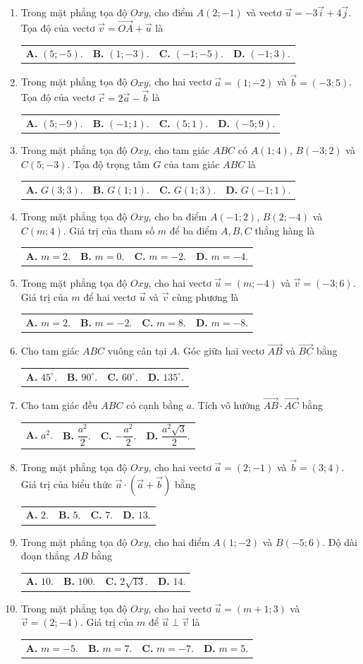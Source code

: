 \documentclass[10pt,a4paper]{article}
\makeatletter
\newcommand{\four}[4]{\par\noindent\begin{tabularx}{\linewidth}{@{}*{4}{>{\raggedright\arraybackslash}X}@{}}\textbf{A.} #1&\textbf{B.} #2&\textbf{C.} #3&\textbf{D.} #4\end{tabularx}}
\makeatother
\begin{document}
\begin{enumerate}
\item Trong mặt phẳng tọa độ $Oxy$, cho điểm $A(2; -1)$ và vectơ $\vec{u} = -3\vec{i} + 4\vec{j}$. Tọa độ của vectơ $\vec{v} = \vec{OA} + \vec{u}$ là
\four{$(5; -5)$.}{$(1; -3)$.}{$(-1; -5)$.}{$(-1; 3)$.}

\item Trong mặt phẳng tọa độ $Oxy$, cho hai vectơ $\vec{a} = (1; -2)$ và $\vec{b} = (-3; 5)$. Tọa độ của vectơ $\vec{c} = 2\vec{a} - \vec{b}$ là
\four{$(5; -9)$.}{$(-1; 1)$.}{$(5; 1)$.}{$(-5; 9)$.}

\item Trong mặt phẳng tọa độ $Oxy$, cho tam giác $ABC$ có $A(1; 4)$, $B(-3; 2)$ và $C(5; -3)$. Tọa độ trọng tâm $G$ của tam giác $ABC$ là
\four{$G(3; 3)$.}{$G(1; 1)$.}{$G(1; 3)$.}{$G(-1; 1)$.}

\item Trong mặt phẳng tọa độ $Oxy$, cho ba điểm $A(-1; 2)$, $B(2; -4)$ và $C(m; 4)$. Giá trị của tham số $m$ để ba điểm $A, B, C$ thẳng hàng là
\four{$m = 2$.}{$m = 0$.}{$m = -2$.}{$m = -4$.}
\pagebreak

\item Trong mặt phẳng tọa độ $Oxy$, cho hai vectơ $\vec{u} = (m; -4)$ và $\vec{v} = (-3; 6)$. Giá trị của $m$ để hai vectơ $\vec{u}$ và $\vec{v}$ cùng phương là
\four{$m = 2$.}{$m = -2$.}{$m = 8$.}{$m = -8$.}

\item Cho tam giác $ABC$ vuông cân tại $A$. Góc giữa hai vectơ $\vec{AB}$ và $\vec{BC}$ bằng
\four{$45^\circ$.}{$90^\circ$.}{$60^\circ$.}{$135^\circ$.}

\item Cho tam giác đều $ABC$ có cạnh bằng $a$. Tích vô hướng $\vec{AB} \cdot \vec{AC}$ bằng
\four{$a^2$.}{$\dfrac{a^2}{2}$.}{$-\dfrac{a^2}{2}$.}{$\dfrac{a^2\sqrt{3}}{2}$.}

\item Trong mặt phẳng tọa độ $Oxy$, cho hai vectơ $\vec{a} = (2; -1)$ và $\vec{b} = (3; 4)$. Giá trị của biểu thức $\vec{a} \cdot (\vec{a} + \vec{b})$ bằng
\four{$2$.}{$5$.}{$7$.}{$13$.}

\item Trong mặt phẳng tọa độ $Oxy$, cho hai điểm $A(1; -2)$ và $B(-5; 6)$. Độ dài đoạn thẳng $AB$ bằng
\four{$10$.}{$100$.}{$2\sqrt{13}$.}{$14$.}

\item Trong mặt phẳng tọa độ $Oxy$, cho hai vectơ $\vec{u} = (m + 1; 3)$ và $\vec{v} = (2; -4)$. Giá trị của $m$ để $\vec{u} \perp \vec{v}$ là
\four{$m = -5$.}{$m = 7$.}{$m = -7$.}{$m = 5$.}


\end{enumerate}
\end{document}

